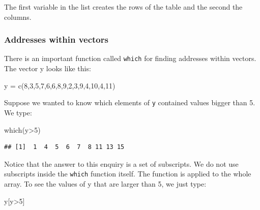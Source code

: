 \documentclass[
]{book}
\newenvironment{Shaded}{\begin{snugshade}}{\end{snugshade}}
\newcommand{\DecValTok}[1]{\textcolor[rgb]{0.00,0.00,0.81}{#1}}
\newcommand{\FunctionTok}[1]{\textcolor[rgb]{0.00,0.00,0.00}{#1}}
\newcommand{\NormalTok}[1]{#1}
\newcommand{\OtherTok}[1]{\textcolor[rgb]{0.56,0.35,0.01}{#1}}
\newcommand{\SpecialCharTok}[1]{\textcolor[rgb]{0.00,0.00,0.00}{#1}}
\theoremstyle{definition}
\theoremstyle{definition}
\theoremstyle{definition}
\theoremstyle{definition}
\theoremstyle{remark}
\begin{document}
The first variable in the list creates the rows of the table and the second the columns.

\hypertarget{addresses-within-vectors}{%
\subsubsection{Addresses within vectors}\label{addresses-within-vectors}}

There is an important function called \texttt{which} for finding addresses within vectors. The vector y looks like this:

\begin{Shaded}
\begin{Highlighting}[]
\NormalTok{y }\OtherTok{=} \FunctionTok{c}\NormalTok{(}\DecValTok{8}\NormalTok{,}\DecValTok{3}\NormalTok{,}\DecValTok{5}\NormalTok{,}\DecValTok{7}\NormalTok{,}\DecValTok{6}\NormalTok{,}\DecValTok{6}\NormalTok{,}\DecValTok{8}\NormalTok{,}\DecValTok{9}\NormalTok{,}\DecValTok{2}\NormalTok{,}\DecValTok{3}\NormalTok{,}\DecValTok{9}\NormalTok{,}\DecValTok{4}\NormalTok{,}\DecValTok{10}\NormalTok{,}\DecValTok{4}\NormalTok{,}\DecValTok{11}\NormalTok{)}
\end{Highlighting}
\end{Shaded}

Suppose we wanted to know which elements of \texttt{y} contained values bigger than 5. We type:

\begin{Shaded}
\begin{Highlighting}[]
\FunctionTok{which}\NormalTok{(y}\SpecialCharTok{\textgreater{}}\DecValTok{5}\NormalTok{)}
\end{Highlighting}
\end{Shaded}

\begin{verbatim}
## [1]  1  4  5  6  7  8 11 13 15
\end{verbatim}

Notice that the answer to this enquiry is a set of subscripts. We do not use subscripts inside the \texttt{which} function itself. The function is applied to the whole array. To see the values of y that are larger than 5, we just type:

\begin{Shaded}
\begin{Highlighting}[]
\NormalTok{y[y}\SpecialCharTok{\textgreater{}}\DecValTok{5}\NormalTok{]}
\end{Highlighting}
\end{Shaded}
\end{document}
